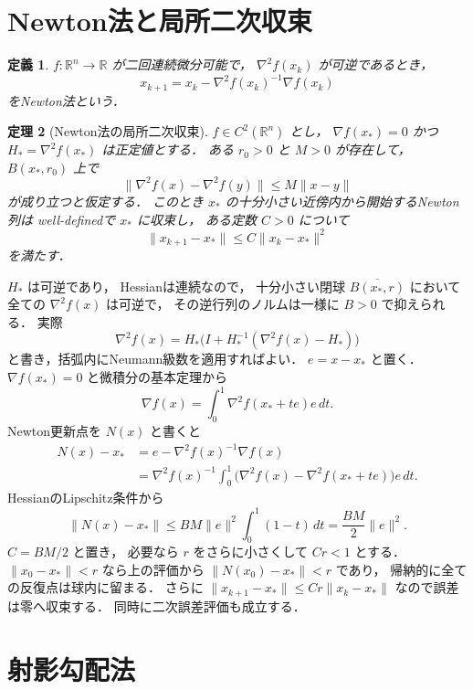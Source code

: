 \documentclass[a5paper,10pt,onecolumn]{jsarticle}
\makeatletter
\theoremstyle{mathnotetheorem}
\newtheorem{theorem}{定理}[section]
\newtheorem{definition}[theorem]{定義}
\renewcommand{\proofname}{証明}
\renewenvironment{proof}[1][\proofname]{%
  \par\pushQED{\qed}\normalfont\topsep4\p@\@plus2\p@\relax
  \trivlist\item[\hskip\labelsep\bfseries #1]\ignorespaces
}{\popQED\endtrivlist\@endpefalse}
\newcommand{\norm}[1]{\lVert #1\rVert}
\makeatother
\begin{document}
\section{Newton法と局所二次収束}

\begin{definition}
$f:\mathbb R^n\to\mathbb R$ が二回連続微分可能で，
$\nabla^2f(x_k)$ が可逆であるとき，
\[
 x_{k+1}
 =x_k-\nabla^2f(x_k)^{-1}\nabla f(x_k)
\]
を\emph{Newton法}という．
\end{definition}

\begin{theorem}[Newton法の局所二次収束]\label{thm:newton}
$f\in C^2(\mathbb R^n)$ とし，
$\nabla f(x_*)=0$ かつ
$H_*=\nabla^2f(x_*)$ は正定値とする．
ある $r_0>0$ と $M>0$ が存在して，
$B(x_*,r_0)$ 上で
\[
 \norm{\nabla^2f(x)-\nabla^2f(y)}
 \le M\norm{x-y}
\]
が成り立つと仮定する．
このとき $x_*$ の十分小さい近傍内から開始するNewton列は
well-definedで $x_*$ に収束し，
ある定数 $C>0$ について
\[
 \norm{x_{k+1}-x_*}\le C\norm{x_k-x_*}^2
\]
を満たす．
\end{theorem}
\begin{proof}
$H_*$ は可逆であり，
Hessianは連続なので，
十分小さい閉球 $\overline{B(x_*,r)}$
において全ての $\nabla^2f(x)$ は可逆で，
その逆行列のノルムは一様に $B>0$ で抑えられる．
実際
\[
 \nabla^2f(x)=H_*
 \bigl(I+H_*^{-1}(\nabla^2f(x)-H_*)\bigr)
\]
と書き，括弧内にNeumann級数を適用すればよい．
$e=x-x_*$ と置く．
$\nabla f(x_*)=0$ と微積分の基本定理から
\[
 \nabla f(x)=\int_0^1\nabla^2f(x_*+te)e\,dt.
\]
Newton更新点を $N(x)$ と書くと
\begin{align*}
 N(x)-x_*
 &=e-\nabla^2f(x)^{-1}\nabla f(x)\\
 &=\nabla^2f(x)^{-1}
 \int_0^1\bigl(\nabla^2f(x)
 -\nabla^2f(x_*+te)\bigr)e\,dt.
\end{align*}
HessianのLipschitz条件から
\[
 \norm{N(x)-x_*}
 \le BM\norm e^2\int_0^1(1-t)\,dt
 =\frac{BM}{2}\norm e^2.
\]
$C=BM/2$ と置き，
必要なら $r$ をさらに小さくして $Cr<1$ とする．
$\norm{x_0-x_*}<r$ なら上の評価から
$\norm{N(x_0)-x_*}<r$ であり，
帰納的に全ての反復点は球内に留まる．
さらに
$\norm{x_{k+1}-x_*}\le Cr\norm{x_k-x_*}$
なので誤差は零へ収束する．
同時に二次誤差評価も成立する．
\end{proof}

\section{射影勾配法}
\end{document}
